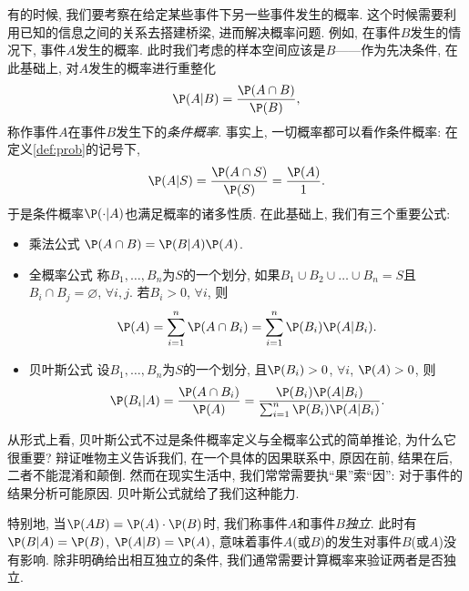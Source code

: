 \documentclass[11pt]{ctexart}
\begin{document}
有的时候, 我们要考察在给定某些事件下另一些事件发生的概率. 
这个时候需要利用已知的信息之间的关系去搭建桥梁, 进而解决概率问题. 
例如, 在事件$B$发生的情况下, 事件$A$发生的概率.
此时我们考虑的样本空间应该是$B$——作为先决条件, 在此基础上, 对$A$发生的概率进行重整化
\begin{equation*}
	\P(A | B) = \frac{\P(A \cap B)}{\P(B)}, 
\end{equation*}
称作事件$A$在事件$B$发生下的\emph{条件概率}.
事实上, 一切概率都可以看作条件概率: 在定义\ref{def:prob}的记号下, 
\begin{equation*}
	\P(A | S) = \frac{\P(A \cap S)}{\P(S)} = \frac{\P(A)}{1}. 
\end{equation*}
于是条件概率$\P(\cdot | A)$也满足概率的诸多性质. 
在此基础上, 我们有三个重要公式: 
\begin{itemize}
	\item {\keben 乘法公式} $\P(A \cap B) = \P(B | A) \P(A)$. 
	\item {\keben 全概率公式} 称$B_1, \dots, B_n$为$S$的一个划分, 如果$B_1 \cup B_2 \cup \dots \cup B_n = S$且$B_i \cap B_j = \varnothing$, $\forall i, j$. 若$B_i > 0$, $\forall i$, 则
		\begin{equation*}
			\P(A) 
			= \sum_{i=1}^n \P(A \cap B_i)
			= \sum_{i=1}^n \P(B_i) \P(A | B_i). 
		\end{equation*}
	\item {\keben 贝叶斯公式} 设$B_1, \dots, B_n$为$S$的一个划分, 且$\P(B_i) > 0$, $\forall i$,  $\P(A) > 0$, 则
		\begin{equation*}
			\P(B_i | A)
			= \frac{\P(A \cap B_i)}{\P(A)}
			= \frac{\P(B_i) \P(A | B_i)}{\sum_{i=1}^n \P(B_i) \P(A | B_i)}. 
		\end{equation*}
\end{itemize}

\begin{remark}
	从形式上看, 贝叶斯公式不过是条件概率定义与全概率公式的简单推论, 为什么它很重要?  
	辩证唯物主义告诉我们, 在一个具体的因果联系中, 原因在前, 结果在后, 二者不能混淆和颠倒. 
	然而在现实生活中, 我们常常需要执“果”索“因”: 对于事件的结果分析可能原因. 
	贝叶斯公式就给了我们这种能力. 
%	
\end{remark}

特别地, 当$\P(A B) = \P(A) \cdot \P(B)$时, 我们称事件$A$和事件$B$\emph{独立}. 
此时有$\P(B | A) = \P(B)$, $\P(A | B) = \P(A)$, 意味着事件$A$(或$B$)的发生对事件$B$(或$A$)没有影响. 
除非明确给出相互独立的条件, 我们通常需要计算概率来验证两者是否独立. 
\end{document}

